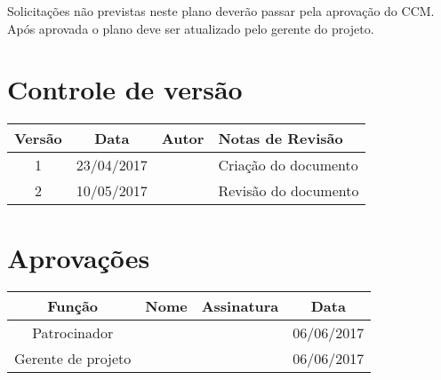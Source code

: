 Solicitações não previstas neste plano deverão passar pela aprovação do CCM. Após aprovada o plano deve ser atualizado pelo gerente do projeto.

\section{Controle de versão}

\begin{table}[H]
	\begin{tabularx}{\textwidth}{| c | c | X | X |}
		\hline
		\textbf{Versão} & \textbf{Data} & \textbf{Autor}        & \textbf{Notas de Revisão} \\
		\hline
		1                & 23/04/2017    & \projectManagerName{} & Criação do documento     \\
		\hline
		2                & 10/05/2017    & \projectManagerName{} & Revisão do documento      \\
		\hline
	\end{tabularx}
	\centering
\end{table}

\section{Aprovações}

\begin{table}[H]
	\begin{tabularx}{\textwidth}{| c | c | X | c |}
		\hline
		\textbf{Função}  & \textbf{Nome}         & \textbf{Assinatura}        & \textbf{Data} \\
		\hline
		Patrocinador       & \projectSponsorName{} & \projectSponsorSignature{} & 06/06/2017    \\
		\hline
		Gerente de projeto & \projectManagerName{} & \projectManagerSignature{} & 06/06/2017    \\
		\hline
	\end{tabularx}
	\centering
\end{table}